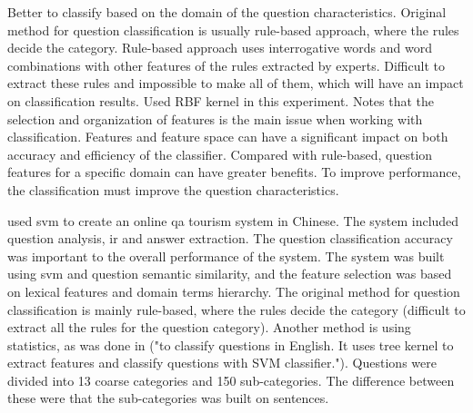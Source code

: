 Better to classify based on the domain of the question characteristics. 
Original method for question classification is usually rule-based approach, where the rules decide the category. 
Rule-based approach uses interrogative words and word combinations with other features of the rules extracted by experts. 
Difficult to extract these rules and impossible to make all of them, which will have an impact on classification results. 
Used RBF kernel in this experiment. 
Notes that the selection and organization of features is the main issue when working with classification. 
Features and feature space can have a significant impact on both accuracy and efficiency of the classifier. 
Compared with rule-based, question features for a specific domain can have greater benefits. 
To improve performance, the classification must improve the question characteristics. 
\cite{Xu2012}

\textcite{Xu2012} used \gls{svm} to create an online \gls{qa} tourism system in Chinese. 
The system included question analysis, \gls{ir} and answer extraction. 
The question classification accuracy was important to the overall performance of the system. 
The system was built using \gls{svm} and question semantic similarity, and the feature selection was based on lexical features and domain terms hierarchy. 
The original method for question classification is mainly rule-based, where the rules decide the category (difficult to extract all the rules for the question category). 
Another method is using statistics, as was done in \cite{Zhang2003} ("to classify questions in English. It uses tree kernel to extract features and classify questions with SVM classifier."). 
Questions were divided into 13 coarse categories and 150 sub-categories. 
The difference between these were that the sub-categories was built on sentences.
\textcite{Xu2012}

